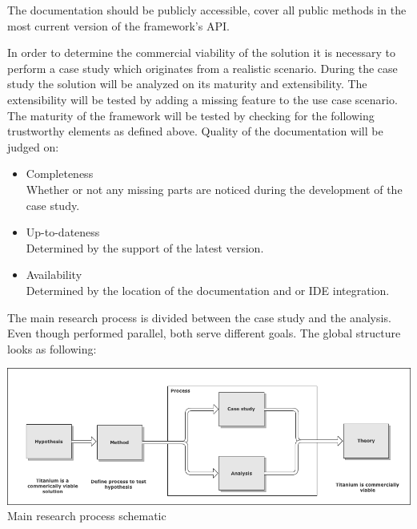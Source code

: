 The documentation should be publicly accessible, cover all public methods in the most current version of the framework's API.

%
%

In order to determine the commercial viability of the solution it is necessary to perform a case study which originates from a realistic scenario. During the case study the solution will be analyzed on its maturity and extensibility.  The extensibility will be tested by adding a missing feature to the use case scenario. The maturity of the framework will be tested by checking for the following trustworthy elements as defined above. Quality of the documentation will be judged on:
\begin{itemize}
	\item Completeness\\
	Whether or not any missing parts are noticed during the development of the case study.
	\item Up-to-dateness\\
	Determined by the support of the latest version.
	\item Availability\\
	Determined by the location of the documentation and or IDE integration.
\end{itemize}

\noindent The main research process is divided between the case study and the analysis. Even though performed parallel, both serve different goals. The global structure looks as following:
\begin{centering}
\includegraphics[scale=0.5]{images/process.png}\\{Main research process schematic}\\
\end{centering}

